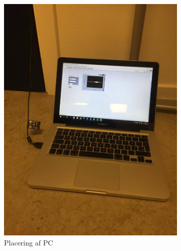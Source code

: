 		\begin{figure}
			\begin{subfigure}[b]{0.4\textwidth}
			\includegraphics[width=\textwidth]{webcam2}
			\caption{Placering af PC}
			\label{fig:webop1}
			\end{subfigure}
			\hfill
			\begin{subfigure}[b]{0.4\textwidth}

\end{subfigure}
\end{figure}
